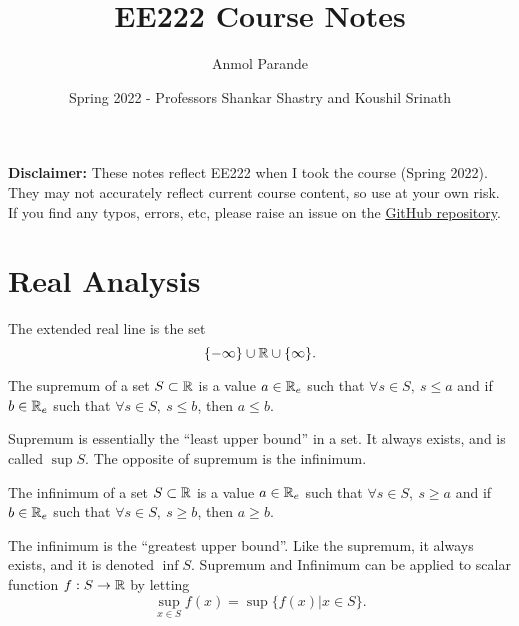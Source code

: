 

\title{EE222 Course Notes}
\author{Anmol Parande}
\date{Spring 2022 - Professors Shankar Shastry and Koushil Srinath}
\maketitle
\textbf{Disclaimer: }These notes reflect EE222 when I took the course (Spring
2022). They may not accurately reflect current course content, so use at your own risk.
If you find any typos, errors, etc, please raise an issue on the \href{https://github.com/parandea17/BerkeleyNotes}{GitHub repository}.
\tableofcontents
\newpage
\section{Real Analysis}
\begin{definition}
	The extended real line is the set \[
		\{-\infty\} \cup \mathbb{R} \cup \{\infty\}.
	\]
	\label{defn:extended-real-line}
\end{definition}
\begin{definition}
	The supremum of a set $S \subset \mathbb{R}$ is a value $a \in \mathbb{R}_e$
	such that $\forall s\in S,\ s \leq a$ and if $b \in \mathbb{R}_e$ such that
	$\forall s\in S,\ s \leq b$, then $a \leq b$.
	\label{defn:supremum}
\end{definition}
Supremum is essentially the ``least upper bound'' in a set. It always exists,
and is called $\sup S$. The opposite of supremum is the infinimum.
\begin{definition}
	The infinimum of a set $S \subset \mathbb{R}$ is a value $a \in \mathbb{R}_e$
	such that $\forall s\in S,\ s \geq a$ and if $b \in \mathbb{R}_e$ such that
	$\forall s\in S,\ s \geq b$, then $a \geq b$.
	\label{defn:infinimum}
\end{definition}
The infinimum is the ``greatest upper bound''. Like the supremum, it always
exists, and it is denoted $\inf S$. Supremum and Infinimum can be applied to
scalar function $f: S\to \mathbb{R}$ by letting \[
	\sup_{x\in S} f(x) = \sup \{f(x) | x\in S \}.
\]
